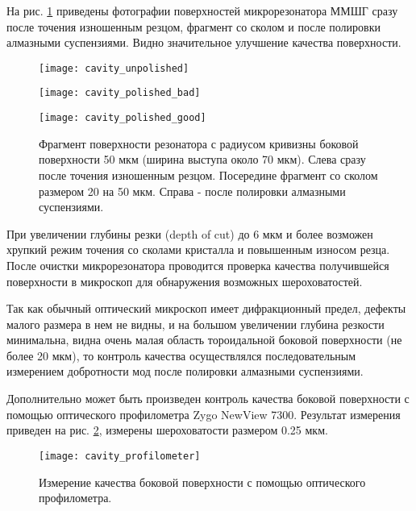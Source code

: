 На рис. \ref{cavity_polished} приведены фотографии поверхностей микрорезонатора ММШГ сразу после точения изношенным резцом, фрагмент со сколом и после полировки алмазными суспензиями. Видно значительное улучшение качества поверхности.

\begin{figure}[ht]
  \begin{minipage}[ht]{0.32\linewidth}\centering
    \texttt{[image: cavity\_unpolished]}
  \end{minipage}
  \hfill
  \begin{minipage}[ht]{0.32\linewidth}\centering
    \texttt{[image: cavity\_polished\_bad]}
  \end{minipage}
  \hfill
  \begin{minipage}[ht]{0.32\linewidth}\centering
    \texttt{[image: cavity\_polished\_good]}
  \end{minipage}
  \caption{Фрагмент поверхности резонатора с радиусом кривизны боковой поверхности 50 мкм (ширина выступа около 70 мкм). Слева сразу после точения изношенным резцом. Посередине фрагмент со сколом размером 20 на 50 мкм. Справа - после полировки алмазными суспензиями.}
  \label{cavity_polished}
\end{figure}

При увеличении глубины резки (depth of cut) до 6 мкм и более возможен хрупкий режим точения со сколами кристалла и повышенным износом резца. После очистки микрорезонатора проводится проверка качества получившейся поверхности в микроскоп для обнаружения возможных шероховатостей.

Так как обычный оптический микроскоп имеет дифракционный предел, дефекты малого размера в нем не видны, и на большом увеличении глубина резкости минимальна, видна очень малая область тороидальной боковой поверхности (не более 20 мкм), то контроль качества осуществлялся последовательным измерением добротности мод после полировки  алмазными суспензиями.

Дополнительно может быть произведен контроль качества боковой поверхности с помощью оптического профилометра Zygo NewView 7300. Результат измерения приведен на рис. \ref{cavity_profilometer}, измерены шероховатости размером 0.25 мкм.

\begin{figure}[ht]
\centering
  \texttt{[image: cavity\_profilometer]}
  \caption{Измерение качества боковой поверхности с помощью оптического профилометра.}
  \label{cavity_profilometer}
\end{figure}

